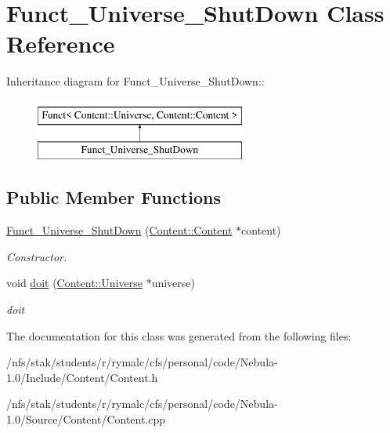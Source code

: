 \hypertarget{classFunct__Universe__ShutDown}{
\section{Funct\_\-Universe\_\-ShutDown Class Reference}
\label{classFunct__Universe__ShutDown}
}
Inheritance diagram for Funct\_\-Universe\_\-ShutDown::\begin{figure}[H]
\begin{center}
\leavevmode
\includegraphics[height=2cm]{classFunct__Universe__ShutDown}
\end{center}
\end{figure}
\subsection*{Public Member Functions}
\begin{DoxyCompactItemize}
\item 
\hypertarget{classFunct__Universe__ShutDown_ae94871d4622e065033fec79a21e2e0a8}{
\hyperlink{classFunct__Universe__ShutDown_ae94871d4622e065033fec79a21e2e0a8}{Funct\_\-Universe\_\-ShutDown} (\hyperlink{classContent_1_1Content}{Content::Content} $\ast$content)}
\label{classFunct__Universe__ShutDown_ae94871d4622e065033fec79a21e2e0a8}

\begin{DoxyCompactList}\small\item\em Constructor. \item\end{DoxyCompactList}\item 
\hypertarget{classFunct__Universe__ShutDown_a79b2b3ce8cc3e2e35106bddb2dd2b104}{
void \hyperlink{classFunct__Universe__ShutDown_a79b2b3ce8cc3e2e35106bddb2dd2b104}{doit} (\hyperlink{classContent_1_1Universe}{Content::Universe} $\ast$universe)}
\label{classFunct__Universe__ShutDown_a79b2b3ce8cc3e2e35106bddb2dd2b104}

\begin{DoxyCompactList}\small\item\em doit \item\end{DoxyCompactList}\end{DoxyCompactItemize}


The documentation for this class was generated from the following files:\begin{DoxyCompactItemize}
\item 
/nfs/stak/students/r/rymalc/cfs/personal/code/Nebula-\/1.0/Include/Content/Content.h\item 
/nfs/stak/students/r/rymalc/cfs/personal/code/Nebula-\/1.0/Source/Content/Content.cpp\end{DoxyCompactItemize}
